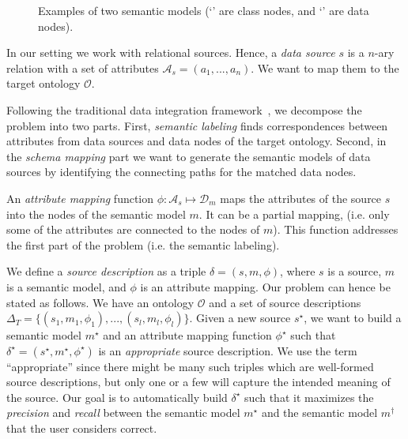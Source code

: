 \documentclass[letterpaper]{article} %
\newcommand{\authornote}[3]{
  {\fbox{\sc 
  #1}:$\blacktriangleright$\textcolor{#2}{\small{#3}}$\blacktriangleleft$}%
}
\newcommand{\npr}[1]{\authornote{NPR}{orange}{#1}}
\begin{document}
\begin{figure}[ht]
{
}
\caption{Examples of two semantic models (`\protect{}' are class nodes, and `\protect{}' are data 
nodes).}
\label{FIG:sem}
\vspace{-3mm}
\end{figure}

In our setting we work with relational sources.
Hence, a \emph{data source} $s$ is a $n$-ary relation with a set of attributes 
$\mathcal{A}_s = (a_1,...,a_n)$.
We want to map them to the target ontology $\mathcal{O}$.

Following the traditional data integration framework~\cite{doan2012principles}, we decompose the problem into two parts.
First, \emph{semantic labeling} \cite{ruemmele2018evaluating} finds 
correspondences between attributes from data sources and data nodes of the 
target ontology.
Second, in the \emph{schema mapping} part we want to generate the semantic models of data sources by identifying the connecting paths for the matched data nodes.

An \emph{attribute mapping} function $\phi : \mathcal{A}_s \mapsto 
\mathcal{D}_m$ maps the attributes of the source $s$ into the nodes of the semantic model $m$. 
It can be a partial mapping, (i.e. only some of the attributes
are connected to the nodes of $m$).
This function addresses the first part of the problem (i.e. the semantic labeling).

We define a \emph{source description} as a triple $\delta = (s, m, \phi)$, where $s$ is a source, $m$ is a semantic model, and $\phi$ is an attribute mapping.
Our problem can hence be stated as follows. We have an ontology 
$\mathcal{O}$ and a set of source descriptions $\Delta_T = \{(s_1, m_1, \phi_1),..., 
(s_l, m_l, \phi_l)\}$.
Given a new source $s^\star$, we want to build a semantic model $m^\star$ and an attribute mapping function $\phi^\star$ such that 
$\delta^\star = (s^\star,m^\star,\phi^\star)$ is an \emph{appropriate} source description. 
We use the term ``appropriate'' since there might be many such triples which are well-formed source descriptions, 
but only one or a few will capture the intended meaning of the source. 
Our goal is to automatically build $\delta^\star$ such that it maximizes the \emph{precision} and \emph{recall} between the semantic model 
$m^\star$ and the semantic model $m^\dag$ that the user considers correct. 
\end{document}
